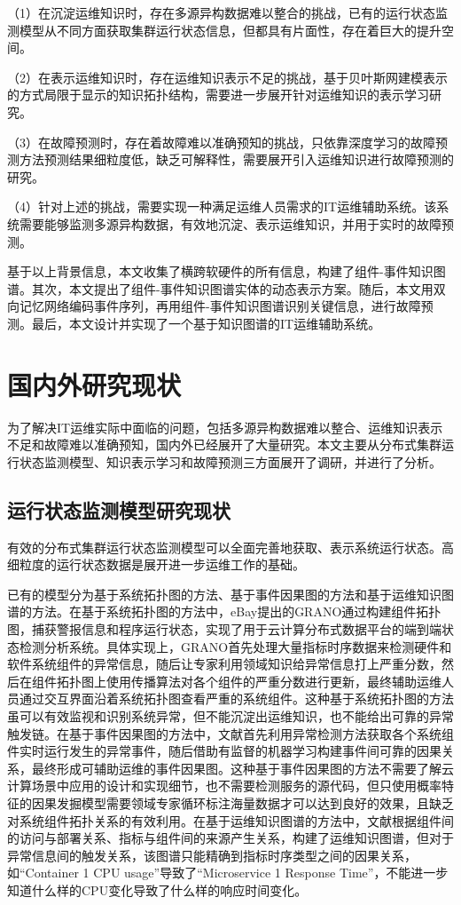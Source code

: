 （1）在沉淀运维知识时，存在多源异构数据难以整合的挑战，已有的运行状态监测模型从不同方面获取集群运行状态信息，但都具有片面性，存在着巨大的提升空间。

（2）在表示运维知识时，存在运维知识表示不足的挑战，基于贝叶斯网建模表示的方式局限于显示的知识拓扑结构，需要进一步展开针对运维知识的表示学习研究。

（3）在故障预测时，存在着故障难以准确预知的挑战，只依靠深度学习的故障预测方法预测结果细粒度低，缺乏可解释性，需要展开引入运维知识进行故障预测的研究。

（4）针对上述的挑战，需要实现一种满足运维人员需求的IT运维辅助系统。该系统需要能够监测多源异构数据，有效地沉淀、表示运维知识，并用于实时的故障预测。

基于以上背景信息，本文收集了横跨软硬件的所有信息，构建了组件-事件知识图谱。其次，本文提出了组件-事件知识图谱实体的动态表示方案。随后，本文用双向记忆网络编码事件序列，再用组件-事件知识图谱识别关键信息，进行故障预测。最后，本文设计并实现了一个基于知识图谱的IT运维辅助系统。

\section{国内外研究现状}
为了解决IT运维实际中面临的问题，包括多源异构数据难以整合、运维知识表示不足和故障难以准确预知，国内外已经展开了大量研究。本文主要从分布式集群运行状态监测模型、知识表示学习和故障预测三方面展开了调研，并进行了分析。

\subsection{运行状态监测模型研究现状}
有效的分布式集群运行状态监测模型可以全面完善地获取、表示系统运行状态。高细粒度的运行状态数据是展开进一步运维工作的基础。

已有的模型分为基于系统拓扑图的方法、基于事件因果图的方法和基于运维知识图谱的方法。在基于系统拓扑图的方法中，eBay提出的GRANO\cite{wang2019grano}通过构建组件拓扑图，捕获警报信息和程序运行状态，实现了用于云计算分布式数据平台的端到端状态检测分析系统。具体实现上，GRANO首先处理大量指标时序数据来检测硬件和软件系统组件的异常信息，随后让专家利用领域知识给异常信息打上严重分数，然后在组件拓扑图上使用传播算法对各个组件的严重分数进行更新，最终辅助运维人员通过交互界面沿着系统拓扑图查看严重的系统组件。这种基于系统拓扑图的方法虽可以有效监视和识别系统异常，但不能沉淀出运维知识，也不能给出可靠的异常触发链。在基于事件因果图的方法中，文献\parencite{nie2016mining-causality-graph}首先利用异常检测方法\cite{nguyen2011pal}获取各个系统组件实时运行发生的异常事件，随后借助有监督的机器学习\cite{breiman2001randomforest}构建事件间可靠的因果关系，最终形成可辅助运维的事件因果图。这种基于事件因果图的方法不需要了解云计算场景中应用的设计和实现细节，也不需要检测服务的源代码，但只使用概率特征的因果发掘模型需要领域专家循环标注海量数据才可以达到良好的效果，且缺乏对系统组件拓扑关系的有效利用。在基于运维知识图谱的方法中，文献\parencite{qiu2020causality-mining-knowledge-graph}根据组件间的访问与部署关系、指标与组件间的来源产生关系，构建了运维知识图谱，但对于异常信息间的触发关系，该图谱只能精确到指标时序类型之间的因果关系，如“Container 1 CPU usage”导致了“Microservice 1 Response Time”\cite{qiu2020causality-mining-knowledge-graph}，不能进一步知道什么样的CPU变化导致了什么样的响应时间变化。

